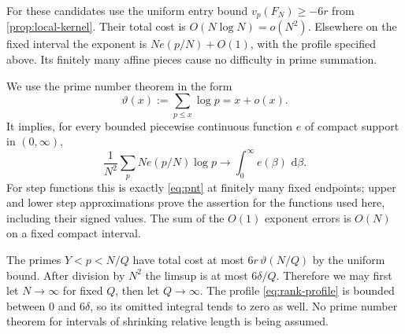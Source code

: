 \documentclass[11pt,letterpaper]{article}
\theoremstyle{definition}
\newcommand{\dd}{\,\mathrm d}
\begin{document}
For these candidates use the uniform entry bound
$v_p(F_N)\ge-6r$ from \cref{prop:local-kernel}. Their total cost is
$O(N\log N)=o(N^2)$. Elsewhere on the fixed interval the exponent is
$Ne(p/N)+O(1)$, with the profile specified above. Its finitely many
affine pieces cause no difficulty in prime summation.

We use the prime number theorem \cite[\S27.12]{dlmf} in the form
\begin{equation}\label{eq:pnt}
 \vartheta(x):=\sum_{p\le x}\log p=x+o(x).
\end{equation}
It implies, for every bounded piecewise continuous function $e$ of compact
support in $(0,\infty)$,
\[
 \frac1{N^2}\sum_p Ne(p/N)\log p\longrightarrow
 \int_0^\infty e(\beta)\,\dd\beta.
\]
For step functions this is exactly \eqref{eq:pnt} at finitely many fixed
endpoints; upper and lower step approximations prove the assertion for
the functions used here, including their signed values. The sum of the
$O(1)$ exponent errors is $O(N)$ on a fixed compact interval.

The primes $Y<p<N/Q$ have total cost at most
$6r\,\vartheta(N/Q)$ by the uniform bound. After division by $N^2$ the
limsup is at most $6\delta/Q$. Therefore we may first let $N\to\infty$
for fixed $Q$, then let $Q\to\infty$.
The profile \eqref{eq:rank-profile} is bounded between $0$ and $6\delta$,
so its omitted integral tends to zero as well. No prime number theorem
for intervals of shrinking relative length is being assumed.
\end{document}
